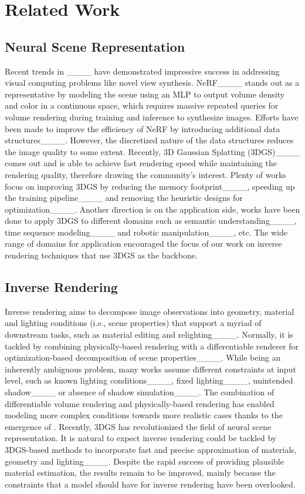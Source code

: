 \section{Related Work}
\subsection{Neural Scene Representation}
Recent trends in ____ have demonstrated impressive success in addressing visual computing problems like novel view synthesis. NeRF____ stands out as a representative by modeling the scene using an MLP to output volume density and color in a continuous space, which requires massive repeated queries for volume rendering during training and inference to synthesize images. Efforts have been made to improve the efficiency of NeRF by introducing additional data structures____. However, the discretized nature of the data structures reduces the image quality to some extent. Recently, 3D Gaussian Splatting (3DGS)____ comes out and is able to achieve fast rendering speed while maintaining the rendering quality, therefore drawing the community's interest. Plenty of works focus on improving 3DGS by reducing the memory footprint____, speeding up the training pipeline____ and removing the heuristic designs for optimization____. Another direction is on the application side, works have been done to apply 3DGS to different domains such as semantic understanding____, time sequence modeling____ and robotic manipulation____, etc. The wide range of domains for application encouraged the focus of our work on inverse rendering techniques that use 3DGS as the backbone.

\subsection{Inverse Rendering}
Inverse rendering aims to decompose image observations into geometry, material and lighting conditions (i.e., scene properties) that support a myriad of downstream tasks, such as material editing and relighting____. Normally, it is tackled by combining physically-based rendering with a differentiable renderer for optimization-based decomposition of scene properties____. While being an inherently ambiguous problem, many works assume different constraints at input level, such as known lighting conditions____, fixed lighting____, unintended shadow____ or absence of shadow simulation____. The combination of differentiable volume rendering and physically-based rendering has enabled modeling more complex conditions towards more realistic cases thanks to the emergence of . Recently, 3DGS has revolutionized the field of neural scene representation. It is natural to expect inverse rendering could be tackled by 3DGS-based methods to incorporate fast and precise approximation of materials, geometry and lighting____. Despite the rapid success of providing plausible material estimation, the results remain to be improved, mainly because the constraints that a model should have for inverse rendering have been overlooked.

